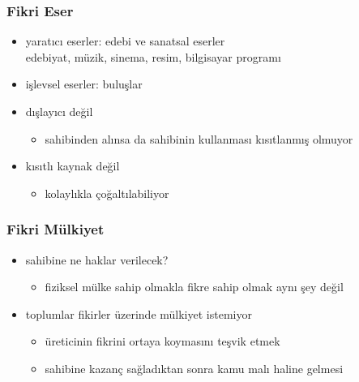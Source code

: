 \documentclass[dvipsnames]{beamer}
\theoremstyle{definition}
\theoremstyle{example}
\theoremstyle{plain}
\begin{document}
\begin{frame}
  \frametitle{Fikri Eser}

  \begin{itemize}
    \item yaratıcı eserler: edebi ve sanatsal eserler\\
      edebiyat, müzik, sinema, resim, bilgisayar programı
    \item işlevsel eserler: buluşlar
  \end{itemize}

  \pause
  \bigskip
  \begin{itemize}
    \item dışlayıcı değil
    \begin{itemize}
      \item sahibinden alınsa da sahibinin kullanması kısıtlanmış olmuyor
    \end{itemize}

    \item kısıtlı kaynak değil
    \begin{itemize}
      \item kolaylıkla çoğaltılabiliyor
    \end{itemize}
  \end{itemize}
\end{frame}

\begin{frame}
  \frametitle{Fikri Mülkiyet}

  \begin{itemize}
    \item sahibine ne haklar verilecek?
    \begin{itemize}
      \item fiziksel mülke sahip olmakla fikre sahip olmak aynı şey değil
    \end{itemize}

    \pause
    \bigskip
    \item toplumlar fikirler üzerinde mülkiyet istemiyor
    \begin{itemize}
      \item üreticinin fikrini ortaya koymasını teşvik etmek
      \item sahibine kazanç sağladıktan sonra kamu malı haline gelmesi
    \end{itemize}
  \end{itemize}
\end{frame}
\end{document}
